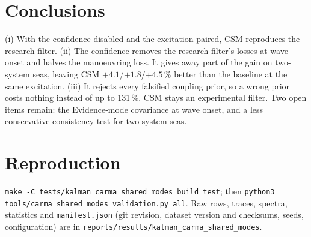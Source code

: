 \documentclass[conference]{IEEEtran}
\begin{document}
\section{Conclusions}
(i) With the confidence disabled and the excitation paired, CSM reproduces
the research filter. (ii) The confidence removes the research filter's
losses at wave onset and halves the manoeuvring loss. It gives away part of
the gain on two-system seas, leaving CSM $+4.1$/$+1.8$/$+4.5$\,\% better than
the baseline at the same excitation. (iii) It rejects every falsified
coupling prior, so a wrong prior costs nothing instead of up to 131\,\%.
CSM stays an experimental filter. Two open items remain: the Evidence-mode
covariance at wave onset, and a less conservative consistency test for
two-system seas.

\section*{Reproduction}
\texttt{make -C tests/kalman\_carma\_shared\_modes build test}; then
\texttt{python3 tools/carma\_shared\_modes\_validation.py all}. Raw rows,
traces, spectra, statistics and \texttt{manifest.json} (git revision, dataset
version and checksums, seeds, configuration) are in
\texttt{reports/results/kalman\_carma\_shared\_modes}.
\end{document}
